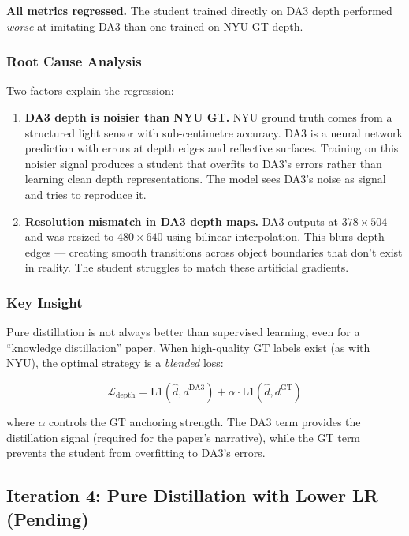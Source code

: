\documentclass[11pt,a4paper]{article}
\begin{document}
\textbf{All metrics regressed.} The student trained directly on DA3 depth
performed \emph{worse} at imitating DA3 than one trained on NYU GT depth.

\subsubsection{Root Cause Analysis}

Two factors explain the regression:

\begin{enumerate}
  \item \textbf{DA3 depth is noisier than NYU GT.}
    NYU ground truth comes from a structured light sensor with
    sub-centimetre accuracy. DA3 is a neural network prediction with
    errors at depth edges and reflective surfaces. Training on this
    noisier signal produces a student that overfits to DA3's errors
    rather than learning clean depth representations. The model sees
    DA3's noise as signal and tries to reproduce it.

  \item \textbf{Resolution mismatch in DA3 depth maps.}
    DA3 outputs at $378 \times 504$ and was resized to $480 \times 640$
    using bilinear interpolation. This blurs depth edges --- creating
    smooth transitions across object boundaries that don't exist in
    reality. The student struggles to match these artificial gradients.
\end{enumerate}

\subsubsection{Key Insight}

Pure distillation is not always better than supervised learning, even for
a ``knowledge distillation'' paper. When high-quality GT labels exist
(as with NYU), the optimal strategy is a \emph{blended} loss:

\[
  \mathcal{L}_{\text{depth}} = \text{L1}(\hat{d}, d^{\text{DA3}})
    + \alpha \cdot \text{L1}(\hat{d}, d^{\text{GT}})
\]

where $\alpha$ controls the GT anchoring strength. The DA3 term provides
the distillation signal (required for the paper's narrative), while the
GT term prevents the student from overfitting to DA3's errors.

\subsection{Iteration 4: Pure Distillation with Lower LR (Pending)}
\end{document}
